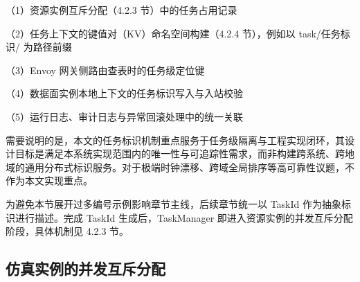 \documentclass[lang=chs, degree=master, blindreview=true, winfonts=true, academic=false]{yanputhesis}
\begin{document}
（1）资源实例互斥分配（4.2.3 节）中的任务占用记录

（2）任务上下文的键值对（KV）命名空间构建（4.2.4 节），例如以 task/任务标识/ 为路径前缀

（3）Envoy 网关侧路由查表时的任务级定位键

（4）数据面实例本地上下文的任务标识写入与入站校验

（5）运行日志、审计日志与异常回滚处理中的统一关联

需要说明的是，本文的任务标识机制重点服务于任务级隔离与工程实现闭环，其设计目标是满足本系统实现范围内的唯一性与可追踪性需求，而非构建跨系统、跨地域的通用分布式标识服务。对于极端时钟漂移、跨域全局排序等高可靠性议题，不作为本文实现重点。

为避免本节展开过多编号示例影响章节主线，后续章节统一以 TaskId 作为抽象标识进行描述。完成 TaskId 生成后，TaskManager 即进入资源实例的并发互斥分配阶段，具体机制见 4.2.3 节。

\subsection{仿真实例的并发互斥分配}
\end{document}
